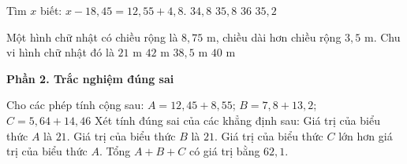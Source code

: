 \begin{ex} %
Tìm $x$ biết: $x - 18{,}45 = 12{,}55 + 4{,}8$.
\choice
{$34{,}8$}
{\True $35{,}8$}
{$36$}
{$35{,}2$}
\end{ex}

\begin{ex} %
Một hình chữ nhật có chiều rộng là $8{,}75\text{ m}$, chiều dài hơn chiều rộng $3{,}5\text{ m}$. Chu vi hình chữ nhật đó là
\choice
{$21\text{ m}$}
{\True $42\text{ m}$}
{$38{,}5\text{ m}$}
{$40\text{ m}$}
\end{ex}

\textbf{Phần 2. Trắc nghiệm đúng sai}

\begin{ex} %
Cho các phép tính cộng sau:
$A = 12{,}45 + 8{,}55$; $B = 7{,}8 + 13{,}2$; $C = 5{,}64 + 14{,}46$
Xét tính đúng sai của các khẳng định sau:
\choiceTF
{\True Giá trị của biểu thức $A$ là $21$.}
{\True Giá trị của biểu thức $B$ là $21$.}
{Giá trị của biểu thức $C$ lớn hơn giá trị của biểu thức $A$.}
{\True Tổng $A + B + C$ có giá trị bằng $62{,}1$.}
\end{ex}


